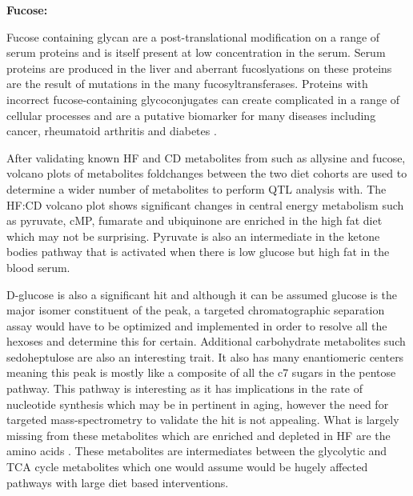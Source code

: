 \documentclass[a4paper]{book}
\begin{document}
	\textbf{Fucose:}
	
	Fucose containing glycan are a post-translational modification on a range of serum proteins and is itself present at low concentration in the serum. Serum proteins are produced in the liver and aberrant fucoslyations on these proteins are the result of mutations in the many fucosyltransferases\citep{Becker2003Fucose}. Proteins with incorrect fucose-containing glycoconjugates can create complicated in a range of cellular processes and are a putative biomarker for many diseases including cancer, rheumatoid  arthritis and diabetes \citep{Wiese1997Effect}. 
	
	After validating known HF and CD metabolites from \citep{Williams2016SystemsFunction} such as allysine and fucose, volcano plots of metabolites foldchanges between the two diet cohorts are used to determine a wider number of metabolites to perform QTL analysis with. The HF:CD volcano plot shows significant changes in central energy metabolism such as pyruvate, cMP, fumarate and ubiquinone are enriched in the high fat diet which may not be surprising. Pyruvate is also an intermediate in the ketone bodies pathway that is activated when there is low glucose but high fat in the blood serum. 
	
	D-glucose is also a significant hit and although it can be assumed glucose is the major isomer constituent of the peak, a targeted chromatographic separation assay would have to be optimized and implemented in order to resolve all the hexoses and determine this for certain. Additional carbohydrate metabolites such sedoheptulose are also an interesting trait. It also has many enantiomeric centers meaning this peak is mostly like a composite of all the c7 sugars in the pentose pathway. This pathway is interesting as it has implications in the rate of nucleotide synthesis which may be in pertinent in aging, however the need for targeted mass-spectrometry to validate the hit is not appealing. What is largely missing from these metabolites which are enriched and depleted in HF are the amino acids . These metabolites are intermediates between the glycolytic and TCA cycle metabolites which one would assume would be hugely affected pathways with large diet based interventions.
	
\end{document}

